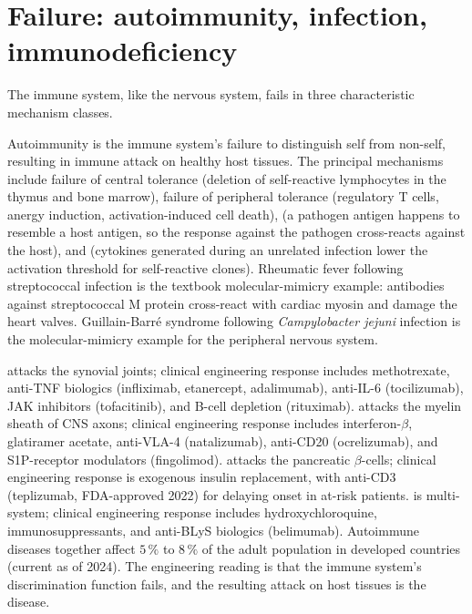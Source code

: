\section{Failure: autoimmunity, infection, immunodeficiency}

The immune system, like the nervous system, fails in three
characteristic mechanism classes.

 Autoimmunity is the immune system's failure
to distinguish self from non-self, resulting in immune attack on
healthy host tissues. The principal mechanisms include failure of
central tolerance (deletion of self-reactive lymphocytes in the
thymus and bone marrow), failure of peripheral tolerance
(regulatory T cells, anergy induction, activation-induced cell death),
 (a pathogen antigen happens to resemble
a host antigen, so the response against the pathogen cross-reacts
against the host), and  (cytokines
generated during an unrelated infection lower the activation
threshold for self-reactive clones). Rheumatic fever following
streptococcal infection is the textbook molecular-mimicry example:
antibodies against streptococcal M protein cross-react with cardiac
myosin and damage the heart valves. Guillain-Barr\'{e} syndrome
following \emph{Campylobacter jejuni} infection is the
molecular-mimicry example for the peripheral nervous system.

 
attacks the synovial joints; clinical engineering response includes
methotrexate, anti-TNF biologics (infliximab, etanercept,
adalimumab), anti-IL-6 (tocilizumab), JAK inhibitors (tofacitinib),
and B-cell depletion (rituximab). 
attacks the myelin sheath of CNS axons; clinical engineering response
includes interferon-$\beta$, glatiramer acetate, anti-VLA-4
(natalizumab), anti-CD20 (ocrelizumab), and S1P-receptor modulators
(fingolimod).  attacks the pancreatic
$\beta$-cells; clinical engineering response is exogenous insulin
replacement, with anti-CD3 (teplizumab, FDA-approved 2022) for
delaying onset in at-risk patients.  is multi-system; clinical engineering response
includes hydroxychloroquine, immunosuppressants, and anti-BLyS
biologics (belimumab). Autoimmune diseases together affect $5\,\%$
to $8\,\%$ of the adult population in developed countries (current
as of 2024). The engineering reading is that the immune system's
discrimination function fails, and the resulting attack on host
tissues is the disease.

